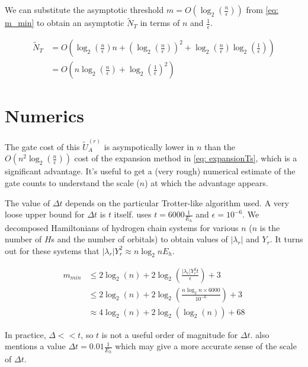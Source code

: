 We can substitute the asymptotic threshold $m = O(\log_2(\frac{n}{\epsilon}))$ from \eqref{eq: m_min} to obtain an asymptotic $\tilde{N}_{T}$ in terms of $n$ and $\frac{1}{\epsilon}$.

\begin{equation}
    \begin{split}
        \tilde{N}_{T} &= O(\log_2(\frac{n}{\epsilon})n + (\log_2(\frac{n}{\epsilon}))^2 + \log_2(\frac{n}{\epsilon})\log_2(\frac{1}{\epsilon})) \\
        &= O(n\log_2(\frac{n}{\epsilon}) + \log_2(\frac{1}{\epsilon})^2) \label{eq: Ts_neps}
    \end{split}
\end{equation}

\section{Numerics}

The gate cost of this $\tilde{U}_A^{(r)}$ is asympotically lower in $n$ than the $O(n^2\log_2(\frac{n}{\epsilon}))$ cost of the expansion method in \eqref{eq: expansionTs}, which is a significant advantage. It's useful to get a (very rough) numerical estimate of the gate counts to understand the scale ($n$) at which the advantage appears.

The value of $\Delta t$ depends on the particular Trotter-like algorithm used. A very loose upper bound for $\Delta t$ is $t$ itself. \cite{Gate_Count} uses $t = 6000 \frac{1}{E_h}$ and $\epsilon = 10^{-6}$. We decomposed Hamiltonians of hydrogen chain systems for various $n$ ($n$ is the number of $H$s and the number of orbitals) to obtain values of $|\lambda_r|$ and $Y_r$. It turns out for these systems that $|\lambda_r|Y_r^2 \approx n\log_2{n} E_h$.

\begin{equation}
    \begin{split}
        m_{min} &\leq 2\log_2(n) + 2\log_2\left(\frac{|\lambda_r|Y_r^2 t}{\epsilon}\right) + 3 \\
        &\leq 2\log_2(n) + 2\log_2\left(\frac{n\log_2{n}\times 6000}{10^{-6}}\right) + 3 \\
        &\approx 4\log_2(n) + 2\log_2(\log_2(n)) + 68
    \end{split}
\end{equation}

In practice, $\Delta << t$, so $t$ is not a useful order of magnitude for $\Delta t$. \cite{Gate_Count} also mentions a value $\Delta t = 0.01 \frac{1}{E_h}$ which may give a more accurate sense of the scale of $\Delta t$.

